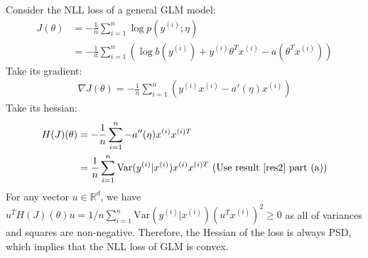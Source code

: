 \begin{answer}
Consider the NLL loss of a general GLM model:
\begin{align}
	J(\theta) &= - \frac{1}{n} \sum \limits_{i = 1}^{n} \log p(y^{(i)}; \eta) \\
	&= - \frac{1}{n} \sum \limits_{i = 1}^{n} \left( \log b(y^{(i)}) + y^{(i)} \theta^T x^{(i)} - a(\theta^T x^{(i)}) \right)
\end{align}
Take its gradient:
\begin{align}
	\nabla J(\theta) = - \frac{1}{n} \sum \limits_{i = 1}^{n} \left(y^{(i)} x^{(i)} - a'(\eta) x^{(i)} \right)
\end{align}
Take its hessian:
\begin{align}
	H(J)(\theta) &= - \frac{1}{n} \sum \limits_{i = 1}^{n} -a''(\eta) x^{(i)} x^{(i)T} \\
	&= \frac{1}{n} \sum \limits_{i = 1}^{n} \text{Var}(y^{(i)}|x^{(i)}) x^{(i)} x^{(i)T} \text{ (Use result \eqref{res2} part (a))}
\end{align}
For any vector $u \in \mathbb{R}^d$, we have $u^T H(J)(\theta) u = 1/n \sum _{i = 1}^{n} \text{Var}(y^{(i)}|x^{(i)}) (u^T x^{(i)})^2 \ge 0$ as all of variances and squares are non-negative. Therefore, the Hessian of the loss is always PSD, which implies that the NLL loss of GLM is convex. \\
\end{answer}
